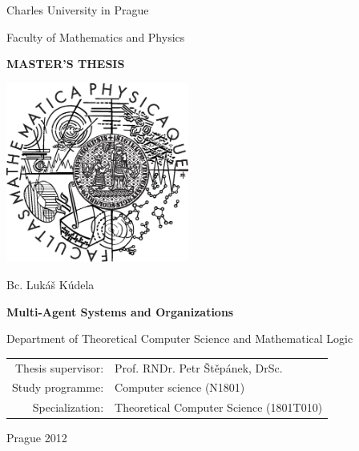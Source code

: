 \begin{titlepage}
\begin{center}

\large
Charles University in Prague

\medskip

Faculty of Mathematics and Physics

\vfill

{\Large \textbf{MASTER'S THESIS}}

\vfill

\includegraphics[width=60mm]{images/mff_logo.eps}

\vfill
\vspace{5mm}

{\LARGE Bc. Lukáš Kúdela}

\vspace{15mm}

{\LARGE \textbf{Multi-Agent Systems and Organizations}}

\vfill

Department of Theoretical Computer Science and Mathematical Logic

\vfill

\begin{tabular}{rl}
Thesis supervisor: & Prof. RNDr. Petr Štěpánek, DrSc.\\
\noalign{\vspace{2mm}}
Study programme: & Computer science (N1801)\\
\noalign{\vspace{2mm}}
Specialization: & Theoretical Computer Science (1801T010)\\
\end{tabular}

\vfill

Prague 2012

\end{center}
\end{titlepage}